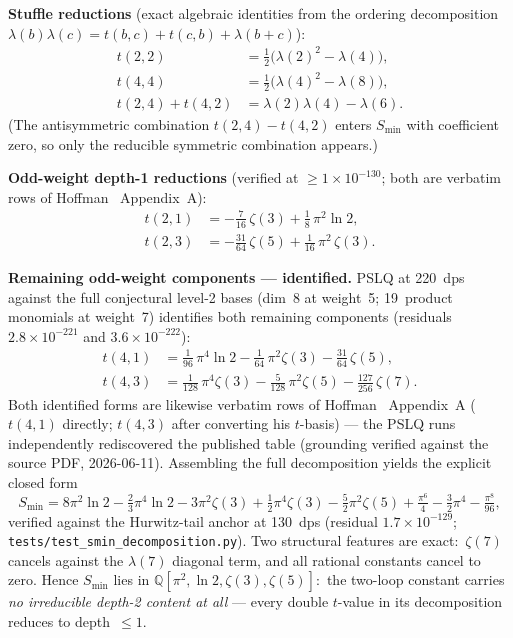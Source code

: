 \documentclass[11pt]{article}
\begin{document}
\textbf{Stuffle reductions} (exact algebraic identities from the ordering
decomposition $\lambda(b)\lambda(c) = t(b,c)+t(c,b)+\lambda(b+c)$):
\begin{align}
  t(2,2) &= \tfrac{1}{2}\bigl(\lambda(2)^2 - \lambda(4)\bigr), \label{eq:stuffle22}\\
  t(4,4) &= \tfrac{1}{2}\bigl(\lambda(4)^2 - \lambda(8)\bigr), \label{eq:stuffle44}\\
  t(2,4)+t(4,2) &= \lambda(2)\lambda(4) - \lambda(6). \label{eq:stuffle2442}
\end{align}
(The antisymmetric combination $t(2,4)-t(4,2)$ enters $S_{\min}$ with
coefficient zero, so only the reducible symmetric combination appears.)

\textbf{Odd-weight depth-1 reductions} (verified at $\ge 1\times10^{-130}$;
both are verbatim rows of Hoffman~\cite{hoffman2019odd} Appendix~A):
\begin{align}
  t(2,1) &= -\tfrac{7}{16}\,\zeta(3) + \tfrac{1}{8}\,\pi^2\ln 2,
  \label{eq:t21}\\
  t(2,3) &= -\tfrac{31}{64}\,\zeta(5) + \tfrac{1}{16}\,\pi^2\,\zeta(3).
  \label{eq:t23}
\end{align}

\textbf{Remaining odd-weight components --- identified.}  PSLQ at 220~dps
against the full conjectural level-2 bases (dim~8 at weight~5; 19~product
monomials at weight~7) identifies both remaining components (residuals
$2.8\times10^{-221}$ and $3.6\times10^{-222}$):
\begin{align}
  t(4,1) &= \tfrac{1}{96}\,\pi^4\ln 2 - \tfrac{1}{64}\,\pi^2\zeta(3)
            - \tfrac{31}{64}\,\zeta(5),
  \label{eq:t41}\\
  t(4,3) &= \tfrac{1}{128}\,\pi^4\zeta(3) - \tfrac{5}{128}\,\pi^2\zeta(5)
            - \tfrac{127}{256}\,\zeta(7).
  \label{eq:t43}
\end{align}
Both identified forms are likewise verbatim rows of
Hoffman~\cite{hoffman2019odd} Appendix~A ($t(4,1)$ directly; $t(4,3)$
after converting his $t$-basis) --- the PSLQ runs independently
rediscovered the published table (grounding verified against the
source PDF, 2026-06-11).  Assembling the full decomposition yields the
explicit closed form
\begin{equation}
  S_{\min} = 8\pi^2\ln 2 - \tfrac{2}{3}\pi^4\ln 2 - 3\pi^2\zeta(3)
    + \tfrac{1}{2}\pi^4\zeta(3) - \tfrac{5}{2}\pi^2\zeta(5)
    + \tfrac{\pi^6}{4} - \tfrac{3}{2}\pi^4 - \tfrac{\pi^8}{96},
  \label{eq:smin_closed}
\end{equation}
verified against the Hurwitz-tail anchor at 130~dps (residual
$1.7\times10^{-129}$; \texttt{tests/test\_smin\_decomposition.py}).  Two
structural features are exact:\ $\zeta(7)$ cancels against the
$\lambda(7)$ diagonal term, and all rational constants cancel to zero.
Hence $S_{\min}$ lies in $\mathbb{Q}[\pi^2, \ln 2, \zeta(3), \zeta(5)]$:\
the two-loop constant carries \emph{no irreducible depth-2 content at
all} --- every double $t$-value in its decomposition reduces to
depth~$\le 1$.
\end{document}
